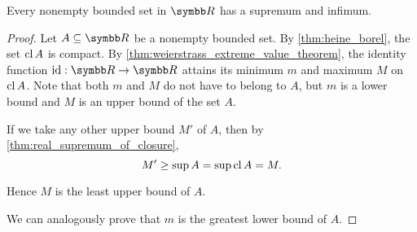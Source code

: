 \begin{proposition}\label{thm:real_bounded_set_has_supremum}
  Every nonempty bounded set in \( \R \) has a supremum and infimum.
\end{proposition}
\begin{proof}
  Let \( A \subseteq \R \) be a nonempty bounded set. By \cref{thm:heine_borel}, the set \( \operatorname{cl} A \) is compact. By \cref{thm:weierstrass_extreme_value_theorem}, the identity function \( \Id: \R \to \R \) attains its minimum \( m \) and maximum \( M \) on \( \operatorname{cl} A \). Note that both \( m \) and \( M \) do not have to belong to \( A \), but \( m \) is a lower bound and \( M \) is an upper bound of the set \( A \).

  If we take any other upper bound \( M' \) of \( A \), then by \cref{thm:real_supremum_of_closure},
  \begin{equation*}
    M' \geq \sup A = \sup \operatorname{cl} A = M.
  \end{equation*}

  Hence \( M \) is the least upper bound of \( A \).

  We can analogously prove that \( m \) is the greatest lower bound of \( A \).
\end{proof}
